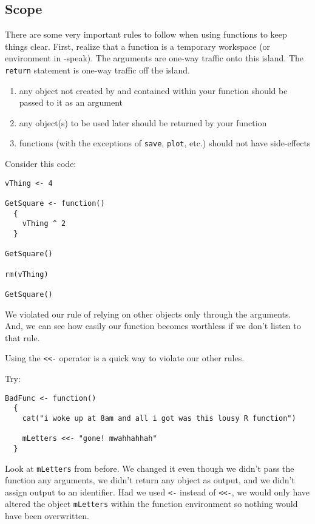 \subsection{Scope}
There are some very important rules to follow when using functions to
keep things clear. First, realize that a function is a temporary
workspace (or environment in \R{}-speak). The arguments are one-way
traffic onto this island. The \texttt{return} statement is one-way
traffic off the island.
\begin{enumerate}
\item any object not created by and contained within your function
  should be passed to it as an argument

\item any object(s) to be used later should be returned by your
  function

\item functions (with the exceptions of \texttt{save}, \texttt{plot},
  etc.) should not have side-effects
\end{enumerate}

Consider this code:
\begin{verbatim}
vThing <- 4

GetSquare <- function()
  {
    vThing ^ 2
  }

GetSquare()

rm(vThing)

GetSquare()
\end{verbatim}

We violated our rule of relying on other objects only through the
arguments. And, we can see how easily our function becomes worthless
if we don't listen to that rule.

Using the \verb!<<-! operator is a quick way to violate our other
rules.

Try:
\begin{verbatim}
BadFunc <- function()
  {
    cat("i woke up at 8am and all i got was this lousy R function")
    
    mLetters <<- "gone! mwahhahhah"
  }
\end{verbatim}

Look at \texttt{mLetters} from before. We changed it even though we
didn't pass the function any arguments, we didn't return any object as
output, and we didn't assign output to an identifier. Had we used
\verb=<-= instead of \verb=<<-=, we would only have altered the object
\texttt{mLetters} within the function environment so nothing would
have been overwritten.




